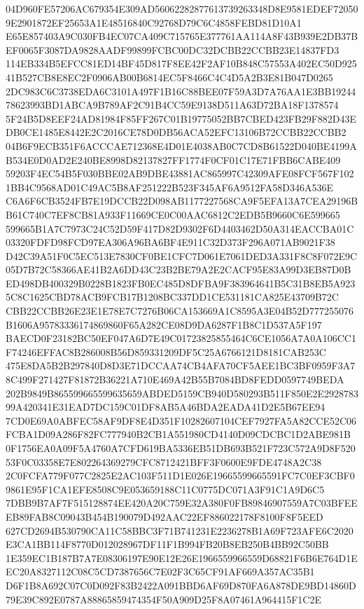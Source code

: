\documentclass[UTF8,fontset=fandol,zihao=-4,a4paper]{ctexart}
\begin{document}
{{04D960FE57206AC679354E309AD56062282877613739263348D8E9581EDEF720509E2901872EF25653A1E48516840C92768D79C6C4858FEBD81D10A1
E65E857403A9C030FB4EC07CA409C715765E377761AA114A8F43B939E2DB37BEF0065F3087DA9828AADF99899FCBC00DC32DCBB22CCBB23E14837FD3
114EB334B5EFCC81ED14BF45D817F8EE42F2AF10B848C57553A402EC50D92541B527CB8E8EC2F0906AB00B6814EC5F8466C4C4D5A2B3E81B047D0265
2DC983C6C3738EDA6C3101A497F1B16C88BEE07F59A3D7A76AA1E3BB1924478623993BD1ABCA9B789AF2C91B4CC59E9138D511A63D72BA18F1378574
5F24B5D8EEF24AD81984F85FF267C01B19775052BB7CBED423FB29F882D43EDB0CE1485E8442E2C2016CE78D0DB56ACA52EFC13106B72CCBB22CCBB2
04B6F9ECB351F6ACCCAE712368E4D01E4038AB0C7CD8B61522D040BE4199AB534E0D0AD2E240BE8998D82137827FF1774F0CF01C17E71FBB6CABE409
59203F4EC54B5F030BBE02AB9DBE43881AC865997C42309AFE08FCF567F1021BB4C9568AD01C49AC5B8AF251222B523F345AF6A9512FA58D346A536E
C6A6F6CB3524FB7E19DCCB22D098AB1177227568CA9F5EFA13A7CEA29196BB61C740C7EF8CB81A933F11669CE0C00AAC6812C2EDB5B9660C6E599665
599665B1A7C7973C24C52D59F417D82D9302F6D4403462D50A314EACCBA01C03320FDFD98FCD97EA306A96BA6BF4E911C32D373F296A071AB9021F38
D42C39A51F0C5EC513E7830CF0BE1CFC7D061E7061DED3A331F8C8F072E9C05D7B72C58366AE41B2A6DD43C23B2BE79A2E2CACF95E83A99D3EB87D0B
ED498DB400329B0228B1823FB0EC485D8DFBA9F383964641B5C31B8EB5A9235C8C1625CBD78ACB9FCB17B1208BC337DD1CE531181CA825E43709B72C
CBB22CCBB26E23E1E78E7C7276B06CA153669A1C8595A3E04B52D777255076B1606A95783336174869860F65A282CE08D9DA6287F1B8C1D537A5F197
BAECD0F23182BC50EF047A6D7E49C01723825855464C6CE1056A7A0A106CC1F74246EFFAC8B286008B56D859331209DF5C25A6766121D8181CAB253C
475E8DA5B2B297840D8D3E71DCCAA74CB4AFA70CF5AEE1BC3BF0959F3A78C499F271427F81872B36221A710E469A42B55B7084BD8FEDD0597749BEDA
202B9849B865599665599635659ABDED5159CB940D580293B511F850E2E292878399A420341E31EAD7DC159C01DF8AB5A46BDA2EADA41D2E5B67EE94
7CD0E69A0ABFEC58AF9DF8E4D351F10282607104CEF7927FA5A82CCE52C06FCBA1D09A286F82FC777940B2CB1A551980CD4140D09CDCBC1D2ABE981B
0F1756EA0A09F5A4760A7CFD619BA5336EB51DB693B521F723C572A9D8F52053F0C03358E7E802264369279CFC8712421BFF3F0600E9FDE4748A2C38
2C0FCFA779F077C2825E2AC103F511D1E026E19665599665591FC7C0EF3CBF09861E95F1CA1EFE8508C9E053659188C11C0775DC071A3F91C1A9D6C5
7DBB9B7AF7F515128874EE420A20C759E32A380F0FB89846907559A7C03BFEEEB89FAB8C09043B454B190079D492AAC22EF886022178F8100F8F5EED
627CD2694B530790CA11C58BBC3F71B741231E2236278B1A69F723AFE6C2020E3CA1BB114F8770D012028967DF11F1B994FB20B8EB250B4BB92C50BB
1E359EC1B187B7A7E08306197E90E12E26E1966559966559D68821F6B6E764D1EEC20A8327112C08C5CD7387656C7E02F3C65CF91AF669A357AC35B1
D6F1B8A692C07C0D092F83B2422A091BBD6AF69D870FA6A878DE9BD14860D79E39C892E0787A88865859474354F50A909D25F8A07461A964415F1C2E
}}
\end{document}
